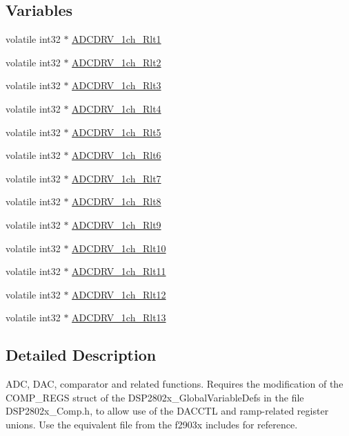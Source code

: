 \subsection*{Variables}
\begin{DoxyCompactItemize}
\item 
volatile int32 $\ast$ \hyperlink{a00005_a42ca9720519e1d0cb7ded4f56da083ba}{A\-D\-C\-D\-R\-V\-\_\-1ch\-\_\-\-Rlt1}
\item 
volatile int32 $\ast$ \hyperlink{a00005_a1ca55c7841c3e4bc154789647a068810}{A\-D\-C\-D\-R\-V\-\_\-1ch\-\_\-\-Rlt2}
\item 
volatile int32 $\ast$ \hyperlink{a00005_a1704632b071d0fff6bdc9629549c5d08}{A\-D\-C\-D\-R\-V\-\_\-1ch\-\_\-\-Rlt3}
\item 
volatile int32 $\ast$ \hyperlink{a00005_ac181cb2fb372cceb0f55844ed941c5d0}{A\-D\-C\-D\-R\-V\-\_\-1ch\-\_\-\-Rlt4}
\item 
volatile int32 $\ast$ \hyperlink{a00005_a7b586f409f6daf8232917fbd976532a4}{A\-D\-C\-D\-R\-V\-\_\-1ch\-\_\-\-Rlt5}
\item 
volatile int32 $\ast$ \hyperlink{a00005_ae8182c9b35af2d72b1c18ea41ccece2d}{A\-D\-C\-D\-R\-V\-\_\-1ch\-\_\-\-Rlt6}
\item 
volatile int32 $\ast$ \hyperlink{a00005_a4fa6265d0bf9b69d560d8f9f488b98c1}{A\-D\-C\-D\-R\-V\-\_\-1ch\-\_\-\-Rlt7}
\item 
volatile int32 $\ast$ \hyperlink{a00005_a0415309d16a115f0116a26aeda91aabd}{A\-D\-C\-D\-R\-V\-\_\-1ch\-\_\-\-Rlt8}
\item 
volatile int32 $\ast$ \hyperlink{a00005_adea6b0b8533e0d56a5c6cbac1c1e705f}{A\-D\-C\-D\-R\-V\-\_\-1ch\-\_\-\-Rlt9}
\item 
volatile int32 $\ast$ \hyperlink{a00005_ad1b851523cd317f0910f2db4220f32da}{A\-D\-C\-D\-R\-V\-\_\-1ch\-\_\-\-Rlt10}
\item 
volatile int32 $\ast$ \hyperlink{a00005_ad4435404e2f432a8c3a449dd23cda8f0}{A\-D\-C\-D\-R\-V\-\_\-1ch\-\_\-\-Rlt11}
\item 
volatile int32 $\ast$ \hyperlink{a00005_ac3656f047361723ec883e6ebfe3f026a}{A\-D\-C\-D\-R\-V\-\_\-1ch\-\_\-\-Rlt12}
\item 
volatile int32 $\ast$ \hyperlink{a00005_ad7ef0544a173d3c7883f0e739b7d2096}{A\-D\-C\-D\-R\-V\-\_\-1ch\-\_\-\-Rlt13}
\end{DoxyCompactItemize}


\subsection{Detailed Description}
A\-D\-C, D\-A\-C, comparator and related functions. Requires the modification of the C\-O\-M\-P\-\_\-\-R\-E\-G\-S struct of the D\-S\-P2802x\-\_\-\-Global\-Variable\-Defs in the file D\-S\-P2802x\-\_\-\-Comp.\-h, to allow use of the D\-A\-C\-C\-T\-L and ramp-\/related register unions. Use the equivalent file from the f2903x includes for reference. 

